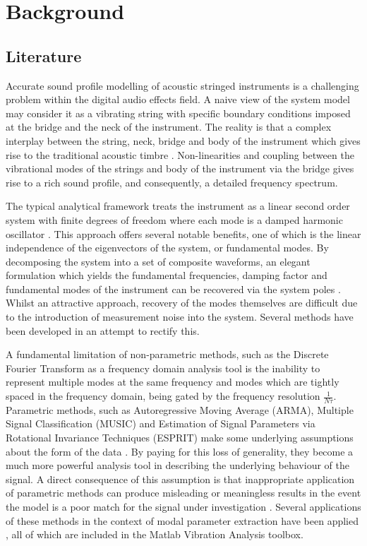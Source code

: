 \section{Background}
\subsection{Literature}
\label{sec:lit}

Accurate sound profile modelling of acoustic stringed instruments is a challenging problem within the digital audio effects field. A naive view of the system model may consider it as a vibrating string with specific boundary conditions imposed at the bridge and the neck of the instrument. The reality is that a complex interplay between the string, neck, bridge and body of the instrument which gives rise to the traditional acoustic timbre \cite{rossing-string-instruments}.
Non-linearities and coupling between the vibrational modes of the strings and body of the instrument via the bridge gives rise to a rich sound profile, and consequently, a detailed frequency spectrum.

The typical analytical framework treats the instrument as a linear second order system with finite degrees of freedom where each mode is a damped harmonic oscillator \cite{modal-analysis-violin}. This approach offers several notable benefits, one of which is the linear independence of the eigenvectors of the system, or fundamental modes. By decomposing the system into a set of composite waveforms, an elegant formulation which yields the fundamental frequencies, damping factor and fundamental modes of the instrument can be recovered via the system poles \cite{juang-1994-book}. Whilst an attractive approach, recovery of the modes themselves are difficult due to the introduction of measurement noise into the system. Several methods have been developed in an attempt to rectify this.

A fundamental limitation of non-parametric methods, such as the Discrete Fourier Transform as a frequency domain analysis tool is the inability to represent multiple modes at the same frequency and modes which are tightly spaced in the frequency domain, being gated by the frequency resolution $\frac{1}{N\tau}$. Parametric methods, such as Autoregressive Moving Average (ARMA), Multiple Signal Classification (MUSIC) and Estimation of Signal Parameters via Rotational Invariance Techniques (ESPRIT) make some underlying assumptions about the form of the data \cite{music, esprit}. By paying for this loss of generality, they become a much more powerful analysis tool in describing the underlying behaviour of the signal. A direct consequence of this assumption is that inappropriate application of parametric methods can produce misleading or meaningless results in the event the model is a poor match for the signal under investigation \cite{hayes}.
Several applications of these methods in the context of modal parameter extraction have been applied \cite{mode-extraction}, all of which are included in the Matlab Vibration Analysis toolbox.

